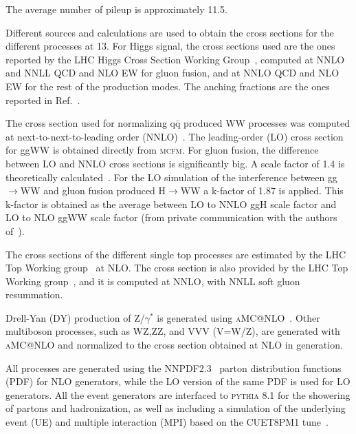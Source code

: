 The average number of pileup is approximately 11.5.


Different sources and calculations are used to obtain the cross sections for the different processes at 13\TeV. 
For Higgs signal, the cross sections used are the ones reported by the LHC Higgs Cross Section Working Group~\cite{temphiggsxsecs},
computed at NNLO and NNLL QCD and NLO EW for gluon fusion, and at NNLO QCD and NLO EW for the rest of the production modes.
The 	anching fractions are the ones reported in Ref.~\cite{Heinemeyer:2013tqa}. 

The cross section used for normalizing $\mathrm{q\bar q}$ produced WW processes was computed at next-to-next-to-leading order
(NNLO)~\cite{Gehrmann:2014fva}. The leading-order (LO) cross section for ggWW is obtained directly from \textsc{mcfm}.
For gluon fusion, the difference between LO and NNLO cross sections is significantly big.
A scale factor of 1.4 is theoretically calculated~\cite{Caola:2015rqy}. For the LO simulation of the interference between 
gg$\rightarrow$WW and gluon fusion  produced H$\rightarrow$WW a k-factor of 1.87 is applied. 
This k-factor is obtained as the average between LO to NNLO ggH scale factor and LO to NLO ggWW scale factor 
(from private communication with the authors of~\cite{Caola:2015rqy}). 

The cross sections of the different single top processes are estimated by the LHC Top Working group~\cite{singletop} at NLO.
The \ttbar cross section is also provided by the LHC Top Working group~\cite{topxsec}, and it is computed at NNLO, with NNLL soft gluon resummation. 

Drell-Yan (DY) production of Z/$\gamma^{*}$ is generated using \textsc{aMC@NLO}~\cite{Alwall:2014hca}. 
Other multiboson processes, such as WZ,ZZ, and VVV (V=W/Z), are generated with \textsc{aMC@NLO} and normalized
to the cross section obtained at NLO in generation.

All processes are generated using the NNPDF2.3~\cite{Ball:2013hta,Ball:2011uy} parton distribution functions (PDF) for NLO generators,
while the LO version of the same PDF is used for LO generators. All the event generators are interfaced 
to \textsc{pythia} 8.1 for the showering of partons and hadronization, as well as including a simulation of the 
underlying event (UE) and multiple interaction (MPI) based on the CUET8PM1 tune~\cite{Khachatryan:2015pea}. 
